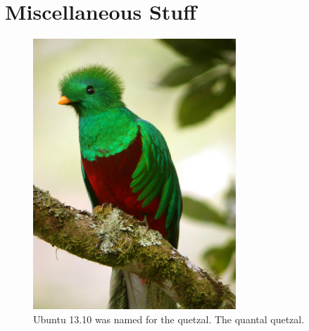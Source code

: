 \chapter{Miscellaneous Stuff}
\label{app:misc}



\begin{figure}[ht] \centering
    \includegraphics[width=3in]{./figs/resplendent_quetzal.jpg}
    \caption{Ubuntu 13.10 was named for the quetzal. The quantal quetzal.} \label{fig:quetzal}
\end{figure}




